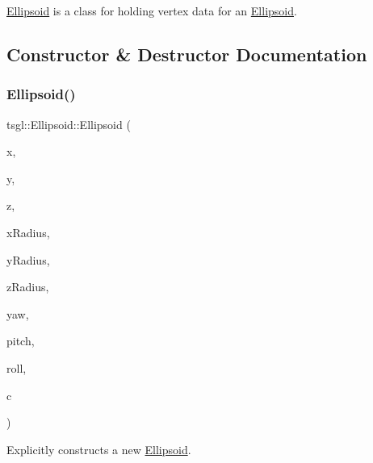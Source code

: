 \hyperlink{classtsgl_1_1_ellipsoid}{Ellipsoid} is a class for holding vertex data for an \hyperlink{classtsgl_1_1_ellipsoid}{Ellipsoid}. 

\subsection{Constructor \& Destructor Documentation}
\mbox{\label{classtsgl_1_1_ellipsoid_afd749d93e94a1d0310fb64e01d348cec}} 
\subsubsection{\texorpdfstring{Ellipsoid()}{Ellipsoid()}\hspace{0.1cm}{\footnotesize\ttfamily [1/2]}}
{\footnotesize\ttfamily tsgl\+::\+Ellipsoid\+::\+Ellipsoid (\begin{DoxyParamCaption}\item[{float}]{x,  }\item[{float}]{y,  }\item[{float}]{z,  }\item[{G\+Lfloat}]{x\+Radius,  }\item[{G\+Lfloat}]{y\+Radius,  }\item[{G\+Lfloat}]{z\+Radius,  }\item[{float}]{yaw,  }\item[{float}]{pitch,  }\item[{float}]{roll,  }\item[{\hyperlink{structtsgl_1_1_color_float}{Color\+Float}}]{c }\end{DoxyParamCaption})}



Explicitly constructs a new \hyperlink{classtsgl_1_1_ellipsoid}{Ellipsoid}. 

